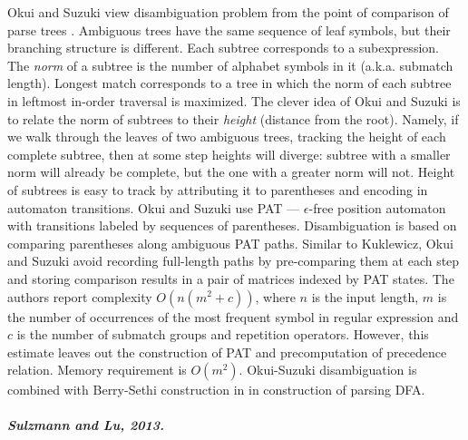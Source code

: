 \documentclass[AMA,STIX1COL]{WileyNJD-v2}
\begin{document}
Okui and Suzuki view disambiguation problem from the point of comparison of parse trees \cite{OS13}.
Ambiguous trees have the same sequence of leaf symbols, but their branching structure is different.
Each subtree corresponds to a subexpression.
The \emph{norm} of a subtree is the number of alphabet symbols in it (a.k.a. submatch length).
Longest match corresponds to a tree in which the norm of each subtree in leftmost in-order traversal is maximized.
The clever idea of Okui and Suzuki is to relate the norm of subtrees to their \emph{height} (distance from the root).
Namely, if we walk through the leaves of two ambiguous trees, tracking the height of each complete subtree,
then at some step heights will diverge:
subtree with a smaller norm will already be complete, but the one with a greater norm will not.
Height of subtrees is easy to track by attributing it to parentheses and encoding in automaton transitions.
Okui and Suzuki use PAT --- $\epsilon$-free position automaton with transitions labeled by sequences of parentheses.
Disambiguation is based on comparing parentheses along ambiguous PAT paths.
Similar to Kuklewicz, Okui and Suzuki avoid recording full-length paths
by pre-comparing them at each step and storing comparison results in a pair of matrices indexed by PAT states.
The authors report complexity $O(n(m^2 + c))$, where
$n$ is the input length,
$m$ is the number of occurrences of the most frequent symbol in regular expression
and $c$ is the number of submatch groups and repetition operators.
However, this estimate leaves out the construction of PAT and precomputation of precedence relation.
Memory requirement is $O(m^2)$.
Okui-Suzuki disambiguation is combined with Berry-Sethi construction in \cite{Bor15} in construction of parsing DFA.

\subparagraph{Sulzmann and Lu, 2013.}
\end{document}
